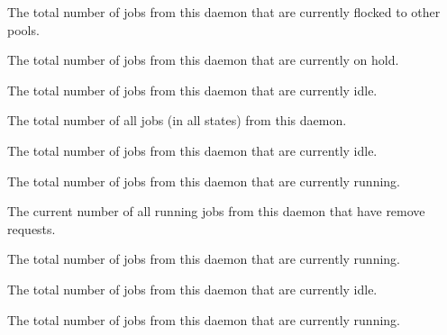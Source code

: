 \begin{description}
\item[\AdAttr{TotalFlockedJobs}:] The total number of jobs from this
   daemon that are currently flocked to other pools.

\item[\AdAttr{TotalHeldJobs}:] The total number of jobs from this
   daemon that are currently on hold.

\item[\AdAttr{TotalIdleJobs}:] The total number of jobs from this
   daemon that are currently idle.

\item[\AdAttr{TotalJobAds}:] The total number of all jobs (in all 
  states) from this  daemon.

\item[\AdAttr{TotalLocalIdleJobs}:] The total number of 
    jobs from this
   daemon that are currently idle.

\item[\AdAttr{TotalLocalRunningJobs}:] The total number of 
    jobs from this
   daemon that are currently running.

\item[\AdAttr{TotalRemovedJobs}:] The current number of all running jobs
  from this  daemon that have remove requests.

\item[\AdAttr{TotalRunningJobs}:] The total number of jobs from this
   daemon that are currently running.

\item[\AdAttr{TotalSchedulerIdleJobs}:] The total number of 
    jobs from this
   daemon that are currently idle.

\item[\AdAttr{TotalSchedulerRunningJobs}:] The total number of 
    jobs from this
   daemon that are currently running.


\end{description}
